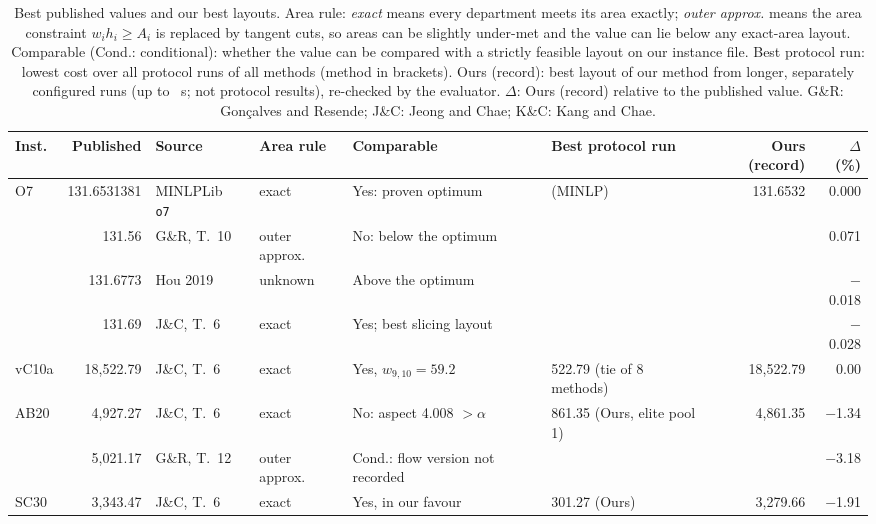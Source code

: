 \begin{table}[tbp]
\centering
\caption{Best published values and our best layouts. Area rule: \emph{exact} means every department meets its
area exactly; \emph{outer approx.} means the area constraint $w_ih_i\ge A_i$ is replaced by tangent cuts, so
areas can be slightly under-met and the value can lie below any exact-area layout. Comparable (Cond.: conditional):
whether the value can be compared with a strictly feasible layout on our instance file.
Best protocol run: lowest cost over all protocol runs of all methods (method in brackets).
Ours (record): best layout of our method from longer, separately configured runs (up to \bxRecMaxTL~s;
not protocol results), re-checked by the evaluator. $\Delta$: Ours (record) relative to the published value.
G\&R: Gon\c{c}alves and Resende; J\&C: Jeong and Chae; K\&C: Kang and Chae.}
\label{tab:bx-records}
\footnotesize
\setlength{\tabcolsep}{2.5pt}
\begin{threeparttable}
\begin{tabular}{lrll>{\raggedright\arraybackslash}p{2.35cm}>{\raggedleft\arraybackslash}p{2.2cm}rr}
\toprule
Inst. & Published & Source & Area rule & Comparable & Best protocol run & Ours (record) & $\Delta$ (\%)\\
\midrule
O7 & 131.6531381 & MINLPLib \texttt{o7}~\cite{minlplib_o7} & exact & Yes: proven optimum & 131.6531 (MINLP) & 131.6532 & 0.000 \\
 & 131.56 & G\&R, T.~10~\cite{goncalves2015} & outer approx. & No: below the optimum &  &  & 0.071 \\
 & 131.6773 & Hou 2019\tnote{a} & unknown & Above the optimum &  &  & $-$0.018 \\
 & 131.69 & J\&C, T.~6~\cite{jeong2026} & exact & Yes; best slicing layout &  &  & $-$0.028 \\
\addlinespace
vC10a & 18{,}522.79 & J\&C, T.~6~\cite{jeong2026} & exact & Yes, $w_{9,10}=59.2$\tnote{b} & 18{,}522.79 (tie of 8 methods) & 18{,}522.79 & 0.00 \\
\addlinespace
AB20 & 4{,}927.27 & J\&C, T.~6~\cite{jeong2026} & exact & No: aspect 4.008 $>\alpha$ & 4{,}861.35 (Ours, elite pool 1) & 4{,}861.35 & $-$1.34 \\
 & 5{,}021.17 & G\&R, T.~12~\cite{goncalves2015} & outer approx. & Cond.: flow version not recorded &  &  & $-$3.18 \\
\addlinespace
SC30 & 3{,}343.47 & J\&C, T.~6~\cite{jeong2026} & exact & Yes, in our favour\tnote{c} & 3{,}301.27 (Ours) & 3{,}279.66 & $-$1.91 \\

\end{tabular}
\end{threeparttable}
\end{table}
